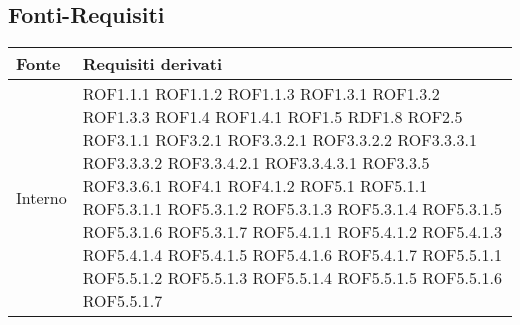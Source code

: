 \subsection{Fonti-Requisiti} %
\label{ssub:fonti_requisiti}
\begin{center}
\def\arraystretch{1.5}
\bgroup
\begin{longtable}{| p{4cm} | p{4cm} |}
\hline
\textbf{Fonte} & \textbf{Requisiti derivati} \\
\hline
Interno & ROF1.1.1 \newline ROF1.1.2 \newline ROF1.1.3 \newline ROF1.3.1 \newline ROF1.3.2 \newline ROF1.3.3 \newline ROF1.4 \newline ROF1.4.1 \newline ROF1.5 \newline RDF1.8 \newline ROF2.5 \newline ROF3.1.1 \newline ROF3.2.1 \newline ROF3.3.2.1 \newline ROF3.3.2.2 \newline ROF3.3.3.1 \newline ROF3.3.3.2 \newline ROF3.3.4.2.1 \newline ROF3.3.4.3.1 \newline ROF3.3.5 \newline ROF3.3.6.1 \newline ROF4.1 \newline ROF4.1.2 \newline ROF5.1 \newline ROF5.1.1 \newline ROF5.3.1.1 \newline ROF5.3.1.2 \newline ROF5.3.1.3 \newline ROF5.3.1.4 \newline ROF5.3.1.5 \newline ROF5.3.1.6 \newline ROF5.3.1.7 \newline ROF5.4.1.1 \newline ROF5.4.1.2 \newline ROF5.4.1.3 \newline ROF5.4.1.4 \newline ROF5.4.1.5 \newline ROF5.4.1.6 \newline ROF5.4.1.7 \newline ROF5.5.1.1 \newline ROF5.5.1.2 \newline ROF5.5.1.3 \newline ROF5.5.1.4 \newline ROF5.5.1.5 \newline ROF5.5.1.6 \newline ROF5.5.1.7 \\

\end{longtable}
\end{center}
